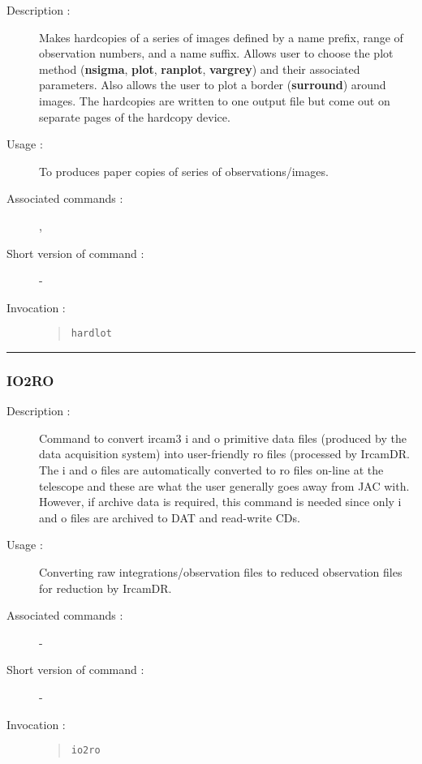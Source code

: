 \begin{description}

\item[Description :] Makes hardcopies of a series of images defined by
a name prefix, range of observation numbers, and a name suffix.  Allows
user to choose the plot method ({\bf nsigma}, {\bf plot}, {\bf
ranplot}, {\bf vargrey}) and their associated parameters.  Also allows
the user to plot a border ({\bf surround}) around images.  The
hardcopies are written to one output file but come out on separate
pages of the hardcopy device.

\item[Usage :] To produces paper copies of series of observations/images.
\item[Associated commands :] {\tt {}},
{\tt {}}
\item[Short version of command :] -
\item[Invocation :]

\begin{quote}{\tt  hardlot }\end{quote}

\end{description}

\hrule
\subsubsection*{\label{IO2RO}IO2RO}

\begin{description}

\item[Description :] Command to convert {\sc ircam3} {\sc i} and {\sc
o} primitive data files (produced by the data acquisition system) into
user-friendly {\sc ro} files (processed by {\sc IrcamDR}.  The {\sc i}
and {\sc o} files are automatically converted to {\sc ro} files on-line
at the telescope and these are what the user generally goes away from
JAC with.  However, if archive data is required, this command is needed
since only {\sc i} and {\sc o} files are archived to DAT and read-write
CDs.

\item[Usage :] Converting raw integrations/observation files to reduced
observation files for reduction by {\sc IrcamDR}.
\item[Associated commands :] -
\item[Short version of command :] -
\item[Invocation :]

\begin{quote}{\tt  io2ro }\end{quote}

\end{description}

